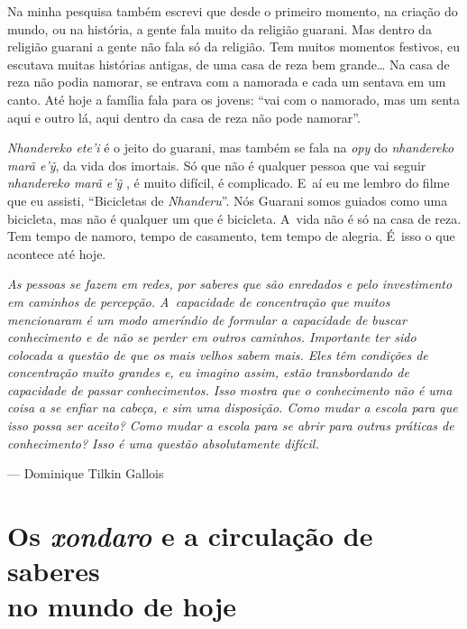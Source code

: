 Na minha pesquisa também escrevi que desde o primeiro momento, na
criação do mundo, ou na história, a gente fala muito da religião
guarani. Mas dentro da religião guarani a gente não fala só da
religião. Tem muitos momentos festivos, eu escutava muitas histórias
antigas, de uma casa de reza bem grande\ldots{} Na casa de reza não podia
namorar, se entrava com a namorada e cada um sentava em um canto. Até
hoje a família fala para os jovens: ``vai com o namorado, mas um senta
aqui e outro lá, aqui dentro da casa de reza não pode namorar''.

\emph{Nhandereko ete’i} é o jeito do guarani, mas também se fala na \emph{opy} do
\emph{nhandereko marã e’ỹ}, da vida dos imortais. Só que não é qualquer
pessoa que vai seguir \emph{nhandereko marã e’ỹ} , é muito difícil, é
complicado. E~aí eu me lembro do filme que eu assisti, ``Bicicletas de
\emph{Nhanderu}''. Nós Guarani somos guiados como uma bicicleta, mas não é
qualquer um que é bicicleta. A~vida não é só na casa de reza. Tem tempo
de namoro, tempo de casamento, tem tempo de alegria. É~isso o que
acontece até hoje.

\clearpage

\vspace*{\fill}

\begin{flushright}
\begin{minipage}[c]{0.85\textwidth}
\raggedleft
\footnotesize
\emph{As pessoas se fazem em redes, por saberes que são enredados e pelo
investimento em caminhos de percepção. A~capacidade de concentração que
muitos mencionaram é um modo ameríndio de formular a capacidade de
buscar conhecimento e de não se perder em outros caminhos. Importante
ter sido colocada a questão de que os mais velhos sabem mais. Eles têm
condições de concentração muito grandes e, eu imagino assim, estão
transbordando de capacidade de passar conhecimentos. Isso mostra que o
conhecimento não é uma coisa a se enfiar na cabeça, e sim uma
disposição. Como mudar a escola para que isso possa ser aceito? Como
mudar a escola para se abrir para outras práticas de conhecimento? Isso
é uma questão absolutamente difícil.}

\smallskip
\hspace*{\fill}--- Dominique Tilkin Gallois
\end{minipage}
\end{flushright}

\thispagestyle{empty}

\chapter*{Os \emph{xondaro} e a circulação de saberes\\ no mundo de hoje}


